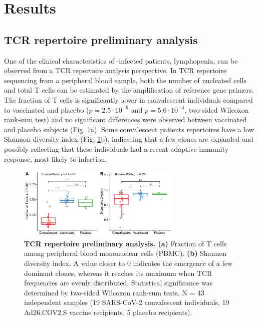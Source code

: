 \chapter*{Results}

\section*{TCR repertoire preliminary analysis}


One of the clinical characteristics of \covid-infected patients, lymphopenia, can be observed from a TCR repertoire analysis perspective. In TCR repertoire sequencing from a peripheral blood sample, both the number of nucleated cells and total T cells can be estimated by the amplification of reference gene primers. The fraction of T cells is significantly lower in convalescent individuals compared to vaccinated and placebo ($p = 2.5\cdot10^{-9}$ and $p = 5.6\cdot10^{-4}$, two-sided Wilcoxon rank-sum test) and no significant differences were observed between vaccinated and placebo subjects (Fig. \ref{fig:lymphopenia}a). Some convalescent patients \TCRB{} repertoires have a low Shannon diversity index (Fig. \ref{fig:lymphopenia}b), indicating that a few clones are expanded and possibly reflecting that these individuals had a recent adaptive immunity response, most likely to \covid{} infection.



\begin{figure}[!t]
	\centering
	\includegraphics[width=0.7\textwidth,keepaspectratio]{figures/fig1.pdf}
	\caption{\textbf{TCR repertoire preliminary analysis. (a)} Fraction of T cells among peripheral blood mononuclear cells (PBMC). \textbf{(b)} Shannon diversity index. A value closer to 0 indicates the emergence of a few dominant clones, whereas it reaches its maximum when TCR frequencies are evenly distributed. Statistical significance was determined by two-sided Wilcoxon rank-sum tests. N = 43 independent samples (19 SARS-CoV-2 convalescent individuals, 19 Ad26.COV2.S vaccine recipients, 5 placebo recipients).}
	\label{fig:lymphopenia}
\end{figure}


